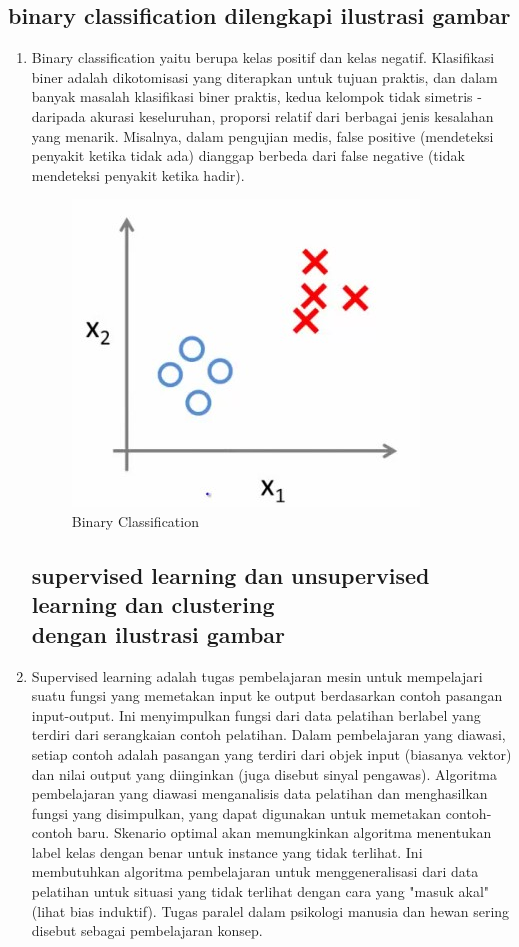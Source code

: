 \subsection{binary classification dilengkapi ilustrasi gambar}

\begin{enumerate}

\item Binary classification yaitu berupa kelas positif dan kelas negatif. Klasifikasi biner adalah dikotomisasi yang diterapkan untuk tujuan praktis, dan dalam banyak masalah klasifikasi biner praktis, kedua kelompok tidak simetris - daripada akurasi keseluruhan, proporsi relatif dari berbagai jenis kesalahan yang menarik. Misalnya, dalam pengujian medis, false positive (mendeteksi penyakit ketika tidak ada) dianggap berbeda dari false negative (tidak mendeteksi penyakit ketika hadir).

\begin{figure}[ht]
\centering
\includegraphics[scale=0.5]{figures/f1.jpg}
\caption{Binary Classification}
\label{contoh}
\end{figure}

\subsection{supervised learning dan unsupervised learning dan clustering\\ dengan ilustrasi gambar}

\item Supervised learning adalah tugas pembelajaran mesin untuk mempelajari suatu fungsi yang memetakan input ke output berdasarkan contoh pasangan input-output. Ini menyimpulkan fungsi dari data pelatihan berlabel yang terdiri dari serangkaian contoh pelatihan. Dalam pembelajaran yang diawasi, setiap contoh adalah pasangan yang terdiri dari objek input (biasanya vektor) dan nilai output yang diinginkan (juga disebut sinyal pengawas). Algoritma pembelajaran yang diawasi menganalisis data pelatihan dan menghasilkan fungsi yang disimpulkan, yang dapat digunakan untuk memetakan contoh-contoh baru. Skenario optimal akan memungkinkan algoritma menentukan label kelas dengan benar untuk instance yang tidak terlihat. Ini membutuhkan algoritma pembelajaran untuk menggeneralisasi dari data pelatihan untuk situasi yang tidak terlihat dengan cara yang "masuk akal" (lihat bias induktif). Tugas paralel dalam psikologi manusia dan hewan sering disebut sebagai pembelajaran konsep.


\end{enumerate}
